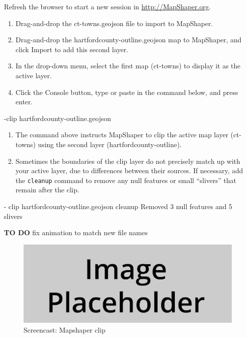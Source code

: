 \documentclass[
  english,
]{book}
\newenvironment{Shaded}{\begin{snugshade}}{\end{snugshade}}
\newcommand{\NormalTok}[1]{#1}
\newcommand{\StringTok}[1]{\textcolor[rgb]{0.31,0.60,0.02}{#1}}
\begin{document}
Refresh the browser to start a new session in \url{http://MapShaper.org}.

\begin{enumerate}
\def\labelenumi{\arabic{enumi}.}
\item
  Drag-and-drop the ct-towns.geojson file to import to MapShaper.
\item
  Drag-and-drop the hartfordcounty-outline.geojson map to MapShaper, and click Import to add this second layer.
\item
  In the drop-down menu, select the first map (ct-towns) to display it as the active layer.
\item
  Click the Console button, type or paste in the command below, and press enter.
\end{enumerate}

\begin{Shaded}
\begin{Highlighting}[]
\NormalTok{{-}clip hartfordcounty{-}outline.geojson}
\end{Highlighting}
\end{Shaded}

\begin{enumerate}
\def\labelenumi{\arabic{enumi}.}
\setcounter{enumi}{4}
\item
  The command above instructs MapShaper to clip the active map layer (ct-towns) using the second layer (hartfordcounty-outline).
\item
  Sometimes the boundaries of the clip layer do not precisely match up with your active layer, due to differences between their sources. If necessary, add the \texttt{cleanup} command to remove any null features or small ``slivers'' that remain after the clip.
\end{enumerate}

\begin{Shaded}
\begin{Highlighting}[]
\StringTok{{-} clip hartfordcounty{-}outline.geojson cleanup}
\StringTok{Removed 3 null features and 5 slivers}
\end{Highlighting}
\end{Shaded}

\textbf{TO DO} fix animation to match new file names

\begin{figure}
\centering
\includegraphics{images/placeholder.jpg}
\caption{\label{fig:mapshaper-clip}Screencast: Mapshaper clip}
\end{figure}
\end{document}
